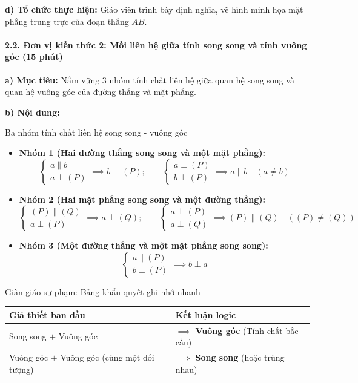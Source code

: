 \documentclass[12pt, a4paper]{article}
\begin{document}
\noindent \textbf{d) Tổ chức thực hiện:}
Giáo viên trình bày định nghĩa, vẽ hình minh họa mặt phẳng trung trực của đoạn thẳng $AB$.

\paragraph{2.2. Đơn vị kiến thức 2: Mối liên hệ giữa tính song song và tính vuông góc (15 phút)}

\noindent \textbf{a) Mục tiêu:}
Nắm vững 3 nhóm tính chất liên hệ giữa quan hệ song song và quan hệ vuông góc của đường thẳng và mặt phẳng.

\noindent \textbf{b) Nội dung:}
\begin{pedabox}{Ba nhóm tính chất liên hệ song song - vuông góc}
\begin{itemize}[leftmargin=0.6cm]
    \item \textbf{Nhóm 1 (Hai đường thẳng song song và một mặt phẳng):}
    $$\begin{cases} a \parallel b \\ a \perp (P) \end{cases} \implies b \perp (P); \qquad \begin{cases} a \perp (P) \\ b \perp (P) \end{cases} \implies a \parallel b \quad (a \neq b)$$
    \item \textbf{Nhóm 2 (Hai mặt phẳng song song và một đường thẳng):}
    $$\begin{cases} (P) \parallel (Q) \\ a \perp (P) \end{cases} \implies a \perp (Q); \qquad \begin{cases} a \perp (P) \\ a \perp (Q) \end{cases} \implies (P) \parallel (Q) \quad ((P) \neq (Q))$$
    \item \textbf{Nhóm 3 (Một đường thẳng và một mặt phẳng song song):}
    $$\begin{cases} a \parallel (P) \\ b \perp (P) \end{cases} \implies b \perp a$$
\end{itemize}
\end{pedabox}

\begin{scaffoldbox}{Giàn giáo sư phạm: Bảng khẩu quyết ghi nhớ nhanh}
\begin{center}
\begin{tabular}{|m{6cm}|m{8cm}|}
\hline
\textbf{Giả thiết ban đầu} & \textbf{Kết luận logic} \\ \hline
Song song $+$ Vuông góc & $\implies$ \textbf{Vuông góc} (Tính chất bắc cầu) \\ \hline
Vuông góc $+$ Vuông góc (cùng một đối tượng) & $\implies$ \textbf{Song song} (hoặc trùng nhau) \\ \hline
\end{tabular}
\end{center}
\end{scaffoldbox}
\end{document}
